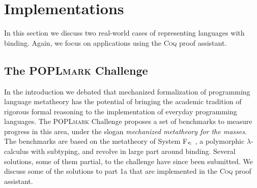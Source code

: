 \documentclass[a4paper,11pt]{article}
\newcommand{\name}[1]{\textsc{#1}\xspace}
\def\Coq{\name{Coq}}
\def\POPLmark{\name{POPLmark}}
\begin{document}
\section{Implementations}

In this section we discuss two real-world cases of representing
languages with binding. Again, we focus on applications using the \Coq
proof assistant.


\subsection{The \POPLmark Challenge}

In the introduction we debated that mechanized formalization of
programming language metatheory has the potential of bringing the
academic tradition of rigorous formal reasoning to the implementation
of everyday programming languages.
The \POPLmark Challenge \cite{poplmark-challenge-05} proposes a set of
benchmarks to measure progress in this area, under the slogan {\em
  mechanized metatheory for the masses}.
The benchmarks are based on the metatheory of System
F$_\texttt{<\!:}$ \cite{cardelli-martini-mitchell-scedrov-94},
a polymorphic $\lambda$-calculus with subtyping,
and revolve in large part around binding.
Several solutions, some of them partial, to the challenge have since
been submitted. We discuss some of the solutions to part 1a that are
implemented in the \Coq proof assistant.
\end{document}
